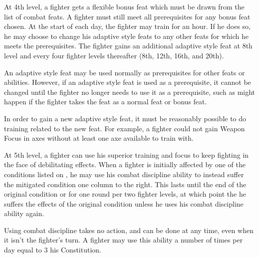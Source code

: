 At 4th level, a fighter gets a flexible bonus feat
which must be drawn from the list of combat feats. A fighter must still
meet all prerequisites for any bonus feat chosen. At the start of each day, the fighter may train for an hour. If he does so, he may choose to change his adaptive style feats to any other feats for which he meets the prerequisites.  The fighter gains an additional adaptive style feat at 8th level and every four fighter levels thereafter (8th, 12th, 16th, and 20th).

\par An adaptive style feat may be used normally as prerequisites for other feats or abilities.
However, if an adaptive style feat is used as a prerequisite, it cannot be changed until the fighter no longer needs to use it as a prerequisite, such as might happen if the fighter takes the feat as a normal feat or bonus feat.
\par In order to gain a new adaptive style feat, it must be reasonably possible to do training related to the new feat. For example, a fighter could not gain Weapon Focus in axes without at least one axe available to train with.

 At 5th level, a fighter can use his superior training and focus to keep fighting in the face of debilitating effects. When a fighter is initially affected by one of the conditions listed on , he may use his combat discipline ability to instead suffer the mitigated condition one column to the right. This lasts until the end of the original condition or for one round per two fighter levels, at which point the he suffers the effects of the original condition unless he uses his combat discipline ability again.
\par Using combat discipline takes no action, and can be done at any time, even when it isn't the fighter's turn. A fighter may use this ability a number of times per day equal to 3 \add his Constitution.

